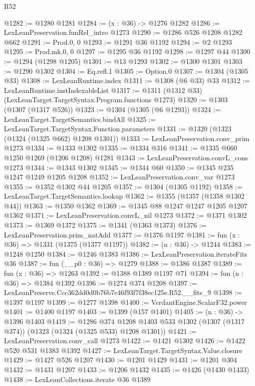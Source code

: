 \begin{lexlean}{R52}
\begin{coremodule}
@1282 := @1280 @1281
@1284 := (x : @36) -> @1276 @1282
@1286 := LexLeanPreservation.funRel_intro @1273
@1290 := @1286 @526 @1208 @1282 @662
@1291 := Prod.{0, 0}
@1293 := @1291 @36 @1192
@1294 := @2 @1293
@1295 := Prod.mk.{0, 0}
@1297 := @1295 @36 @1192
@1298 := @1297 @44
@1300 := @1294 (@1298 @1205)
@1301 := @13 @1293
@1302 := @1300 @1301
@1303 := @1290 @1302
@1304 := Eq.refl.{1}
@1305 := Option.{0}
@1307 := @1304 (@1305 @33)
@1308 := LexLeanRuntime.index
@1311 := @1308 (@6 @33) @33
@1312 := LexLeanRuntime.instIndexableList
@1317 := @1311 (@1312 @33) (LexLeanTarget.TargetSyntax.Program.functions @1273)
@1320 := @1303 (@1307 (@1317 @526))
@1323 := @1304 (@1305 (@6 @1293))
@1324 := LexLeanTarget.TargetSemantics.bindAll
@1325 := LexLeanTarget.TargetSyntax.Function.parameters
@1331 := @1320 (@1323 (@1324 (@1325 @662) @1208 @1301))
@1333 := LexLeanPreservation.conv_prim @1273
@1334 := @1333 @1302
@1335 := @1334 @316
@1341 := @1335 @660 @1250 @1269 (@1206 @1208) @1281
@1343 := LexLeanPreservation.convL_cons @1273
@1344 := @1343 @1302
@1345 := @1344 @60
@1350 := @1345 @235 @1247 @1249 @1205 @1208
@1352 := LexLeanPreservation.conv_var @1273
@1355 := @1352 @1302 @44 @1205
@1357 := @1304 (@1305 @1192)
@1358 := LexLeanTarget.TargetSemantics.lookup
@1362 := @1355 (@1357 (@1358 @1302 @44))
@1363 := @1350 @1362
@1369 := @1345 @88 @1247 @1247 @1205 @1207 @1362
@1371 := LexLeanPreservation.convL_nil @1273
@1372 := @1371 @1302
@1373 := @1369 @1372
@1375 := @1341 (@1363 @1373)
@1376 := LexLeanPreservation.prim_natAdd
@1377 := @1376 @1197
@1381 := fun (x : @36) => @1331 (@1375 (@1377 @1197))
@1382 := (n : @36) -> @1244
@1383 := @1248 @1250
@1384 := @1246 @1383
@1386 := LexLeanPreservation.iterateFits @36
@1387 := fun (__p0 : @36) => @1279
@1388 := @1386 @1387
@1389 := fun (x : @36) => @1263
@1392 := @1388 @1389 @1197 @71
@1394 := fun (n : @36) => @1384 @1392
@1396 := @1274 @374 @1208
@1397 := LexLeanPreserve.Ccc362dd0d0b76b7c46f93f7f38ec125e.R52.__fits_9
@1398 := @1397 @1197
@1399 := @1277 @1398
@1400 := VerdantEngine.ScalarF32.power
@1401 := @1400 @1197
@1403 := @1399 (@157 @1401)
@1405 := (n : @36) -> @1396 @1403
@1419 := @1286
    @374
    @1208
    @1403
    @533
    @1302
    (@1307 (@1317 @374))
    (@1323 (@1324 (@1325 @533) @1208 @1301))
@1421 := LexLeanPreservation.conv_call @1273
@1422 := @1421 @1302
@1426 := @1422 @520 @531 @1383 @1392
@1427 := LexLeanTarget.TargetSyntax.Value.closure
@1429 := @1427 @526 @1207
@1430 := @1201 @1429
@1431 := @1201 @304
@1432 := @1431 @1207
@1433 := @1206 @1432
@1435 := @1426 (@1430 @1433)
@1438 := LexLeanCollections.iterate @36 @1389

\end{coremodule}
\end{lexlean}
